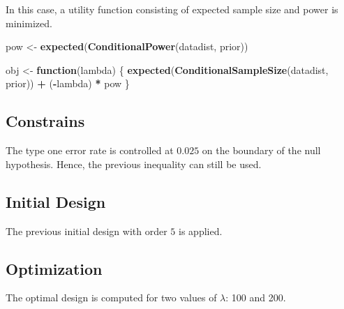 \documentclass[]{book}
\newenvironment{Shaded}{\begin{snugshade}}{\end{snugshade}}
\newcommand{\ControlFlowTok}[1]{\textcolor[rgb]{0.13,0.29,0.53}{\textbf{#1}}}
\newcommand{\KeywordTok}[1]{\textcolor[rgb]{0.13,0.29,0.53}{\textbf{#1}}}
\newcommand{\NormalTok}[1]{#1}
\newcommand{\OperatorTok}[1]{\textcolor[rgb]{0.81,0.36,0.00}{\textbf{#1}}}
\newcommand{\StringTok}[1]{\textcolor[rgb]{0.31,0.60,0.02}{#1}}
\begin{document}
In this case, a utility function consisting of expected sample size and
power is minimized.

\begin{Shaded}
\begin{Highlighting}[]
\NormalTok{pow <-}\StringTok{ }\KeywordTok{expected}\NormalTok{(}\KeywordTok{ConditionalPower}\NormalTok{(datadist, prior))}

\NormalTok{obj <-}\StringTok{ }\ControlFlowTok{function}\NormalTok{(lambda) \{}
    \KeywordTok{expected}\NormalTok{(}\KeywordTok{ConditionalSampleSize}\NormalTok{(datadist, prior)) }\OperatorTok{+}\StringTok{  }
\StringTok{        }\NormalTok{(}\OperatorTok{-}\NormalTok{lambda) }\OperatorTok{*}\StringTok{ }\NormalTok{pow}
\NormalTok{\}}
\end{Highlighting}
\end{Shaded}

\hypertarget{constrains-11}{%
\subsection{Constrains}\label{constrains-11}}

The type one error rate is controlled at \(0.025\) on the boundary of the
null hypothesis. Hence, the previous inequality can still be used.

\hypertarget{initial-design-10}{%
\subsection{Initial Design}\label{initial-design-10}}

The previous initial design with order \(5\) is applied.

\hypertarget{optimization-10}{%
\subsection{Optimization}\label{optimization-10}}

The optimal design is computed for two values of \(\lambda\): 100 and 200.
\end{document}
